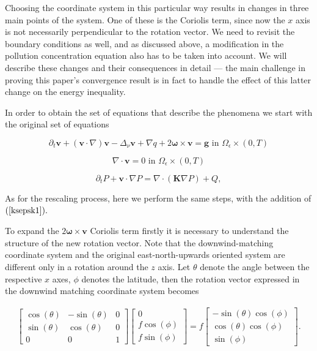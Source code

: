 \documentclass[11pt]{article}
\begin{document}
Choosing the coordinate system in this particular way results in changes in three main points of the system. One of these is the Coriolis term, since now the $x$ axis is not necessarily perpendicular to the rotation vector. We need to revisit the boundary conditions as well, and as discussed above, a modification in the pollution concentration equation also has to be taken into account. We will describe these changes and their consequences in detail --- the main challenge in proving this paper's convergence result is in fact to handle the effect of this latter change on the energy inequality.

In order to obtain the set of equations that describe the phenomena we start with the original set of equations

\begin{equation} \label{originalEQ-V}
  \partial_t \mathbf{v} + (\mathbf{v} \cdot \nabla)\mathbf{v} -\Delta_{\nu} \mathbf{v} + \nabla q + 2 \mathbf{\omega} \times \mathbf{v}= \mathbf{g} \text{ in } \Omega_{\epsilon} \times (0,T)
\end{equation}
    
\begin{equation} \label{originalEQ-I}
  \nabla \cdot \mathbf{v} = 0 \text{ in } \Omega_{\epsilon} \times (0,T)
\end{equation}
    
\begin{equation} \label{diffusive}
  \partial_t P + \mathbf{v} \cdot \nabla P = \nabla \cdot (\mathbf{K} \nabla P) + Q,
\end{equation}

As for the rescaling process, here we perform the same steps, with the addition of $(\ref{ksepsk1}).$

To expand the $2 \mathbf{\omega} \times \mathbf{v}$ Coriolis term firstly it is necessary to understand the structure of the new rotation vector. Note that the downwind-matching coordinate system and the original east-north-upwards oriented system are different only in a rotation around the $z$ axis. Let $\theta$ denote the angle between the respective $x$ axes, $\phi$ denotes the latitude, then the rotation vector expressed in the downwind matching coordinate system becomes

\begin{gather}
 \begin{bmatrix} \cos(\theta) & -\sin(\theta) & 0 \\ \sin(\theta) & \cos(\theta) & 0 \\ 0 & 0 & 1 \end{bmatrix} \begin{bmatrix} 0 \\ f \cos(\phi) \\ f \sin(\phi) \end{bmatrix}
 =
  f \begin{bmatrix} -\sin(\theta)\cos(\phi) \\ \cos(\theta) \cos(\phi) \\ \sin(\phi) \end{bmatrix}.
\end{gather}
\end{document}
